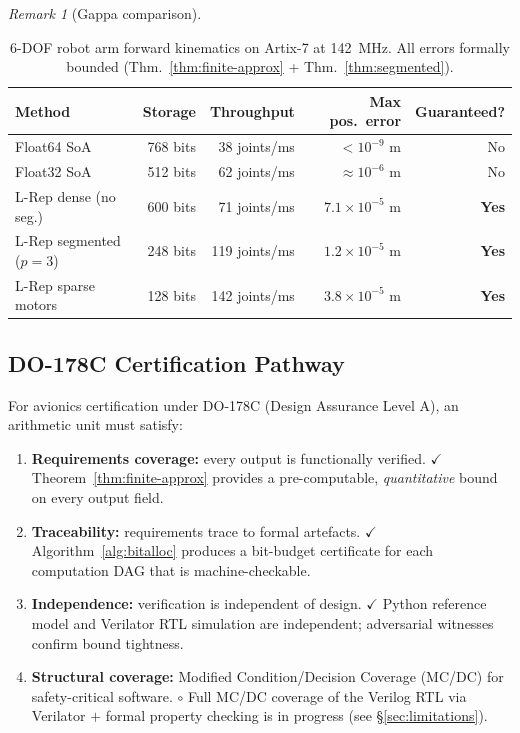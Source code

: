 \documentclass[11pt,a4paper]{article}
\theoremstyle{definition}
\theoremstyle{plain}
\theoremstyle{remark}
\newtheorem{remark}{Remark}[section]
\begin{document}
\begin{remark}[Gappa comparison]
\begin{table}[h]
\centering
\caption{6-DOF robot arm forward kinematics on Artix-7 at 142~MHz.
All errors formally bounded (Thm.~\ref{thm:finite-approx} + Thm.~\ref{thm:segmented}).}
\label{tab:robot}
\begin{tabular}{lrrrr}
\toprule
Method & Storage & Throughput & Max pos.\ error & Guaranteed? \\
\midrule
Float64 SoA & 768 bits & 38 joints/ms & $<10^{-9}$ m & No \\
Float32 SoA & 512 bits & 62 joints/ms & $\approx10^{-6}$ m & No \\
L-Rep dense (no seg.) & 600 bits & 71 joints/ms & $7.1\times10^{-5}$ m & \textbf{Yes} \\
L-Rep segmented ($p=3$) & 248 bits & 119 joints/ms & $1.2\times10^{-5}$ m & \textbf{Yes} \\
L-Rep sparse motors & 128 bits & 142 joints/ms & $3.8\times10^{-5}$ m & \textbf{Yes} \\
\bottomrule
\end{tabular}
\end{table}

\subsection{DO-178C Certification Pathway}
\label{sec:do178c}

For avionics certification under DO-178C (Design Assurance Level A),
an arithmetic unit must satisfy:

\begin{enumerate}
  \item \textbf{Requirements coverage:} every output is functionally verified.
        $\checkmark$ Theorem~\ref{thm:finite-approx} provides a pre-computable,
        \emph{quantitative} bound on every output field.
  \item \textbf{Traceability:} requirements trace to formal artefacts.
        $\checkmark$ Algorithm~\ref{alg:bitalloc} produces a bit-budget
        certificate for each computation DAG that is machine-checkable.
  \item \textbf{Independence:} verification is independent of design.
        $\checkmark$ Python reference model and Verilator RTL simulation
        are independent; adversarial witnesses confirm bound tightness.
  \item \textbf{Structural coverage:} Modified Condition/Decision Coverage
        (MC/DC) for safety-critical software.
        $\circ$ Full MC/DC coverage of the Verilog RTL via Verilator
        $+$ formal property checking is in progress (see \S\ref{sec:limitations}).
\end{enumerate}


\end{remark}
\end{document}
